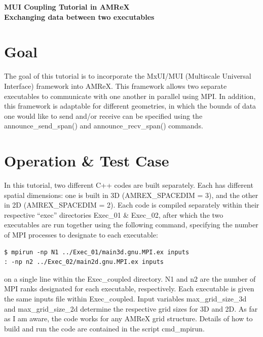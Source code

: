 \documentclass[12pt,letterpaper]{article}
\begin{document}
\vspace*{0.35in}

\begin{centering}
{
\Large
\textbf{MUI Coupling Tutorial in AMReX} \\
\large
\textbf{Exchanging data between two executables} \\
}

\end{centering}

\section*{Goal}

\noindent The goal of this tutorial is to incorporate the MxUI/MUI (Multiscale Universal Interface) framework into AMReX. This framework allows two separate executables to communicate with one another in parallel using MPI. In addition, this framework is adaptable for different geometries, in which the bounds of data one would like to send and/or receive can be specified using the {\selectfont announce\_send\_span()} and {\selectfont announce\_recv\_span()} commands.

\section*{Operation \& Test Case}

\noindent In this tutorial, two different C++ codes are built separately. Each has different spatial dimensions: one is built in 3D ({\selectfont AMREX\_SPACEDIM = 3}), and the other in 2D ({\selectfont AMREX\_SPACEDIM = 2}). Each code is compiled separately within their respective ``exec'' directories {\selectfont Exec\_01 \& Exec\_02}, after which the two executables are run together using the following command, specifying the number of MPI processes to designate to each executable:

\begin{verbatim}
$ mpirun -np N1 ../Exec_01/main3d.gnu.MPI.ex inputs 
: -np n2 ../Exec_02/main2d.gnu.MPI.ex inputs
\end{verbatim}

\noindent on a single line within the {\selectfont Exec\_coupled} directory. {\selectfont N1} and {\selectfont n2} are the number of MPI ranks designated for each executable, respectively. Each executable is given the same inputs file within {\selectfont Exec\_coupled}. Input variables {\selectfont max\_grid\_size\_3d} and {\selectfont max\_grid\_size\_2d} determine the respective grid sizes for 3D and 2D. As far as I am aware, the code works for any AMReX grid structure. Details of how to build and run the code are contained in the script {\selectfont cmd\_mpirun}.\\
\end{document}
